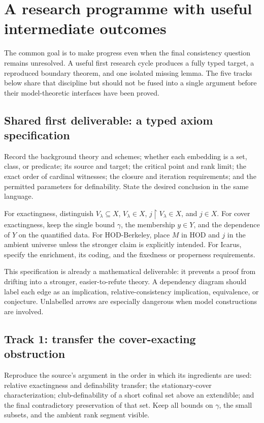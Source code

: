 \documentclass[11pt,letterpaper]{article}
\theoremstyle{definition}
\newcommand{\restr}{\mathbin{\upharpoonright}}
\begin{document}
\section{A research programme with useful intermediate outcomes}\label{sec:programme}

The common goal is to make progress even when the final consistency question remains unresolved. A useful first research cycle produces a fully typed target, a reproduced boundary theorem, and one isolated missing lemma. The five tracks below share that discipline but should not be fused into a single argument before their model-theoretic interfaces have been proved.

\subsection{Shared first deliverable: a typed axiom specification}

Record the background theory and schemes; whether each embedding is a set, class, or predicate; its source and target; the critical point and rank limit; the exact order of cardinal witnesses; the closure and iteration requirements; and the permitted parameters for definability. State the desired conclusion in the same language.

For exactingness, distinguish $V_\lambda\subseteq X$, $V_\lambda\in X$, $j\restr V_\lambda\in X$, and $j\in X$. For cover exactingness, keep the single bound $\gamma$, the membership $y\in Y$, and the dependence of $Y$ on the quantified data. For HOD-Berkeley, place $M$ in HOD and $j$ in the ambient universe unless the stronger claim is explicitly intended. For Icarus, specify the enrichment, its coding, and the fixedness or properness requirements.

This specification is already a mathematical deliverable: it prevents a proof from drifting into a stronger, easier-to-refute theory. A dependency diagram should label each edge as an implication, relative-consistency implication, equivalence, or conjecture. Unlabelled arrows are especially dangerous when model constructions are involved.

\subsection{Track 1: transfer the cover-exacting obstruction}

Reproduce the source's argument in the order in which its ingredients are used: relative exactingness and definability transfer; the stationary-cover characterization; club-definability of a short cofinal set above an extendible; and the final contradictory preservation of that set. Keep all bounds on $\gamma$, the small subsets, and the ambient rank segment visible.
\end{document}
